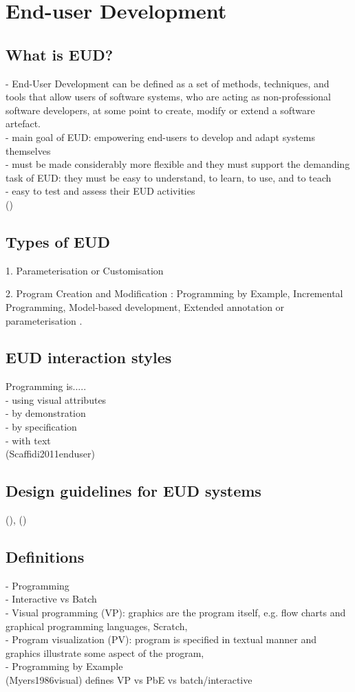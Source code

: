 \section{End-user Development}
\subsection{What is EUD?}
- End-User Development can be defined as a set of methods, techniques, and tools that allow users of software systems, who are acting as non-professional software developers, at some point to create, modify or extend a software artefact. \\
- main goal of EUD: empowering end-users to develop and adapt systems themselves\\
- must be made considerably more flexible and they must support the demanding task of EUD: they must be easy to understand, to learn, to use, and to teach\\
- easy to test and assess their EUD activities\\
 (\cite{lieberman2006end})
 
\subsection{Types of EUD}
1. Parameterisation or Customisation 

2. Program Creation and Modification : Programming by Example, Incremental Programming, Model-based development, Extended annotation or parameterisation .\\
 
\subsection{EUD interaction styles} 

Programming is.....\\
- using visual attributes\\
- by demonstration\\
- by specification\\
- with text\\
 (Scaffidi2011enduser)\\
 
 \subsection{Design guidelines for EUD systems}
  (\cite{ko2004six}), (\cite{repenning2006makes})
 
\subsection{Definitions}
- Programming\\
- Interactive vs Batch\\
- Visual programming (VP): graphics are the program itself, e.g. flow charts and graphical programming languages, Scratch, \\
- Program visualization (PV): program is specified in textual manner and graphics illustrate some aspect of the program, \\
- Programming by Example\\
 (Myers1986visual) defines VP vs PbE vs batch/interactive
 
